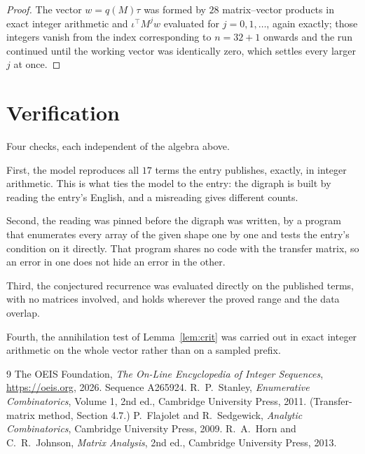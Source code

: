 \documentclass[11pt,a4paper]{article}
\theoremstyle{plain}
\theoremstyle{definition}
\begin{document}
\begin{proof}
The vector $w=q(M)\tau$ was formed by $28$ matrix--vector products in exact integer
arithmetic and $\iota^{\!\top}M^{j}w$ evaluated for $j=0,1,\dots$, again exactly; those
integers vanish from the index corresponding to $n=32+1$ onwards and the run continued
until the working vector was identically zero, which settles every larger $j$ at once.
\end{proof}

\section{Verification}

Four checks, each independent of the algebra above.

First, the model reproduces all $17$ terms the entry publishes, exactly, in integer
arithmetic. This is what ties the model to the entry: the digraph is built by reading the
entry's English, and a misreading gives different counts.

Second, the reading was pinned before the digraph was written, by a program that enumerates
every array of the given shape one by one and tests the entry's condition on it directly. That program shares no code with the transfer matrix, so an error in one does not
hide an error in the other.

Third, the conjectured recurrence was evaluated directly on the published terms, with no
matrices involved, and holds wherever the proved range and the data overlap.

Fourth, the annihilation test of Lemma~\ref{lem:crit} was carried out in exact integer
arithmetic on the whole vector rather than on a sampled prefix.

\begin{thebibliography}{9}
 The OEIS Foundation, \emph{The On-Line Encyclopedia of Integer
Sequences}, \url{https://oeis.org}, 2026. Sequence A265924.
 R.~P.~Stanley, \emph{Enumerative Combinatorics}, Volume 1, 2nd ed.,
Cambridge University Press, 2011. (Transfer-matrix method, Section 4.7.)
 P.~Flajolet and R.~Sedgewick, \emph{Analytic Combinatorics}, Cambridge
University Press, 2009.
 R.~A.~Horn and C.~R.~Johnson, \emph{Matrix Analysis}, 2nd ed., Cambridge
University Press, 2013.
\end{thebibliography}
\end{document}

